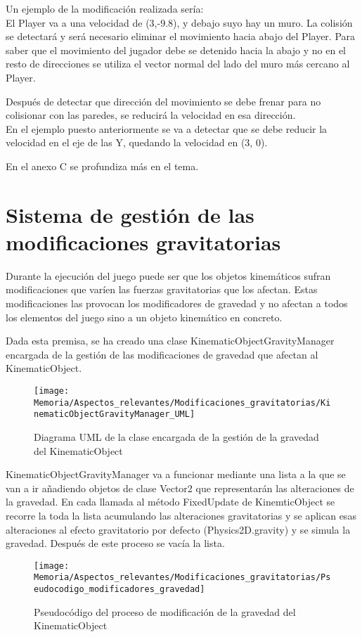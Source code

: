 Un ejemplo de la modificación realizada sería:\\
El Player va a una velocidad de (3,-9.8), y debajo suyo hay un muro. La colisión se detectará y será necesario eliminar el movimiento hacia abajo del Player. Para saber que el movimiento del jugador debe se detenido hacia la abajo y no en el resto de direcciones se utiliza el vector normal del lado del muro más cercano al Player.

Después de detectar que dirección del movimiento se debe frenar para no colisionar con las paredes, se reducirá la velocidad en esa dirección.\\
En el ejemplo puesto anteriormente se va a detectar que se debe reducir la velocidad en el eje de las Y, quedando la velocidad en (3, 0).

En el anexo C se profundiza más en el tema.

\section{Sistema de gestión de las modificaciones gravitatorias}
Durante la ejecución del juego puede ser que los objetos kinemáticos sufran modificaciones que varíen las fuerzas gravitatorias que los afectan. Estas modificaciones las provocan los modificadores de gravedad y no afectan a todos los elementos del juego sino a un objeto kinemático en concreto.

Dada esta premisa, se ha creado una clase KinematicObjectGravityManager encargada de la gestión de las modificaciones de gravedad que afectan al KinematicObject.

\begin{figure}[h]
\centering
\texttt{[image: Memoria/Aspectos\_relevantes/Modificaciones\_gravitatorias/KinematicObjectGravityManager\_UML]}
\caption{Diagrama UML de la clase encargada de la gestión de la gravedad del KinematicObject}
\end{figure}

KinematicObjectGravityManager va a funcionar mediante una lista a la que se van a ir añadiendo objetos de clase Vector2 que representarán las alteraciones de la gravedad. En cada llamada al método FixedUpdate de KinemticObject se recorre la toda la lista acumulando las alteraciones gravitatorias y se aplican esas alteraciones al efecto gravitatorio por defecto (Physics2D.gravity) y se simula la gravedad. Después de este proceso se vacía la lista.

\begin{figure}[h]
\centering
\texttt{[image: Memoria/Aspectos\_relevantes/Modificaciones\_gravitatorias/Pseudocodigo\_modificadores\_gravedad]}
\caption{Pseudocódigo del proceso de modificación de la gravedad del KinematicObject}
\end{figure}


